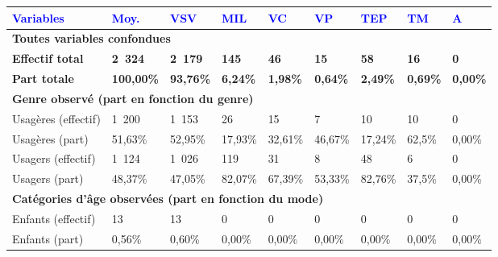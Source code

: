         \begin{longtable}{p{3.7cm}p{0.9cm}p{0.9cm}p{0.9cm}p{0.9cm}p{0.9cm}p{0.9cm}p{0.9cm}p{0.9cm}}
         \textcolor{blue}{\textbf{Variables}} & \textcolor{blue}{\textbf{Moy.}} & \textcolor{blue}{\textbf{VSV}} & \textcolor{blue}{\textbf{MIL}} & \textcolor{blue}{\textbf{VC}} & \textcolor{blue}{\textbf{VP}} & \textcolor{blue}{\textbf{TEP}} & \textcolor{blue}{\textbf{TM}} & \textcolor{blue}{\textbf{A}}\\
        \hline
        \endhead        
\multicolumn{9}{l}{\textbf{Toutes variables confondues}}\\
    \small{\textbf{Effectif total}} & \small{\textbf{2~324}} & \small{\textbf{2~179}} & \small{\textbf{145}} & \small{\textbf{46}} & \small{\textbf{15}} & \small{\textbf{58}} & \small{\textbf{16}} & \small{\textbf{0}}\\   
    \small{\textbf{Part totale}} & \small{\textbf{100,00\%}} & \small{\textbf{93,76\%}} & \small{\textbf{6,24\%}} & \small{\textbf{1,98\%}} & \small{\textbf{0,64\%}} & \small{\textbf{2,49\%}} & \small{\textbf{0,69\%}} & \small{\textbf{0,00\%}}\\
    \hline    
\multicolumn{9}{l}{\textbf{Genre observé (part en fonction du genre)}}\\
    \small{Usagères (effectif)} & \small{1~200} & \small{1~153} & \small{26} & \small{15} & \small{7} & \small{10} & \small{10} & \small{0}\\    
    \small{Usagères (part)} & \small{51,63\%} & \small{52,95\%} & \small{17,93\%} & \small{32,61\%} & \small{46,67\%} & \small{17,24\%} & \small{62,5\%} & \small{0,00\%}\\    
    \small{Usagers (effectif)} & \small{1~124} & \small{1~026} & \small{119} & \small{31} & \small{8} & \small{48} & \small{6} & \small{0}\\    
    \small{Usagers (part)} & \small{48,37\%} & \small{47,05\%} & \small{82,07\%} & \small{67,39\%} & \small{53,33\%} & \small{82,76\%} & \small{37,5\%} & \small{0,00\%}\\
    \hline    
\multicolumn{9}{l}{\textbf{Catégories d'âge observées (part en fonction du mode)}}\\
    \small{Enfants (effectif)} & \small{13} & \small{13} & \small{0} & \small{0} & \small{0} & \small{0} & \small{0} & \small{0}\\    
    \small{Enfants (part)} & \small{0,56\%} & \small{0,60\%} & \small{0,00\%} & \small{0,00\%} & \small{0,00\%} & \small{0,00\%} & \small{0,00\%} & \small{0,00\%}\\    

\end{longtable}
